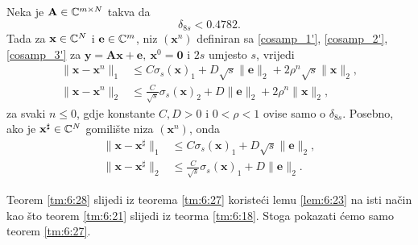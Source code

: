 \documentclass[a4paper,twoside,12pt]{memoir} %
\newcommand{\vect}[1]{\mathbf{#1}}
\renewcommand{\vec}{\vect}
\newcommand{\norm}[1]{\|{#1}\|}
\begin{document}
\begin{thm}\label{tm:6:28}
    Neka je $\vec A \in \C^{m \times N}$ takva da   
    \begin{equation*}
        \delta_{8s} < 0.4782. 
    \end{equation*}
    Tada za $\vec x \in \C^N$ i $\vec e \in \C^m$, niz $(\vec x^n)$ definiran sa \eqref{cosamp_1'}, \eqref{cosamp_2'}, \eqref{cosamp_3'} za $\vec y = \vec{Ax}+\vec e,\ \vec x^0 = \vec 0$ i $2s$ umjesto $s$, vrijedi
    \begin{align*}
        \norm{\vec x - \vec x^n}_1 &\leq C \sigma_s(\vec x)_1 + D \sqrt{s}\norm{\vec e}_2 + 2 \rho^n \sqrt{s} \norm{\vec x}_2, \\[0.5em]
        \norm{\vec x - \vec x^n}_2 &\leq \frac{C}{\sqrt{s}} \sigma_s(\vec x)_2 + D \norm{\vec e}_2 + 2 \rho^n \norm{\vec x}_2,
    \end{align*}
    za svaki $n \leq 0$, gdje konstante $C,D >0 $ i $0 < \rho < 1$ ovise samo o $\delta_{8s}$. Posebno, ako je $\vec x^{\sharp} \in \C^N$ gomili\v{s}te niza $(\vec x^n)$, onda
    \begin{align*}
        \norm{\vec x - \vec x^{\sharp}}_1 &\leq C \sigma_s(\vec x)_1 +D \sqrt{s} \norm{\vec e}_2, \\[0.5em]  
        \norm{\vec x - \vec x^{\sharp}}_2 & \leq \frac{C}{\sqrt{s}} \sigma_s(\vec x)_1 + D \norm{\vec e}_2. 
    \end{align*}
\end{thm}

Teorem \ref{tm:6:28} slijedi iz teorema \ref{tm:6:27} koriste\'ci lemu \ref{lem:6:23} na isti na\v{c}in kao \v{s}to teorem \ref{tm:6:21} slijedi iz teorma \ref{tm:6:18}. Stoga pokazati \'cemo samo teorem \ref{tm:6:27}.
\end{document}
